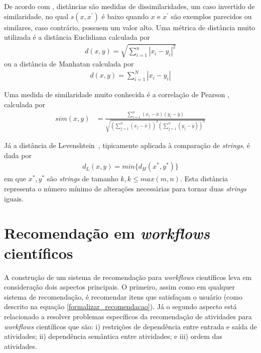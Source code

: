 De acordo com , distâncias são medidas de dissimilaridades, um caso invertido de similaridade, no qual \(s(x,x^{'})\) é baixo quando \(x\) e \(x^{'}\) são exemplos parecidos ou similares, caso contrário, possuem um valor alto. Uma métrica de distância muito utilizada é a distância Euclidiana \cite{Deza2009} calculada por
\begin{align}
d(x,y) = \sqrt{  \sum\limits_{i=1}^{n} |x_{i} - y_{i}|^{2} } \label{dist_euclidiana}
\end{align}
ou a distância de Manhatan \cite{Deza2009} calculada por
\begin{align}
d(x, y) = \sum\limits_{i=1}^{N} |x_{i} - y_{i}|\label{dist_manhattan}
\end{align}

Uma medida de similaridade muito conhecida é a correlação de Pearson \cite{Deza2009}, calculada por
\begin{align}
sim(x,y) &= \frac{\sum\limits_{i=1}^{n} (x_{i}-\bar{x})(y_{i} - \bar{y})}
{\sqrt{ \left( \sum\limits_{j=1}^{n}(x_{j}-\bar{x}) \right) ^{2} \left( \sum\limits_{j=1}^{n}(y_{j}-\bar{y})\right)^{2}} } \label{similaridade_pearson}
\end{align}

Já a distância de Levenshtein~\cite{Deza2009}, tipicamente aplicada à comparação de \emph{strings}, é dada por
\begin{align}
d_{L}(x,y) = min\{d_{H}(x^{*}, y^{*})\} \label{dist_Levenshtein}
\end{align}
em que \(x^{*}, y^{*}\) são \emph{strings} de tamanho \(k, k \leq max(m, n)\). Esta distância representa o número mínimo de alterações necessárias para tornar duas \emph{strings} iguais.

\section{Recomendação em \emph{workflows} científicos}\label{SEC_RECOMENDACAO_WORKFLOW_CIENTIFICO}
A construção de um sistema de recomendação para \emph{workflows} científicos leva em consideração dois aspectos principais. O primeiro, assim como em qualquer sistema de recomendação, é recomendar itens que satisfaçam o usuário (como descrito na equação \eqref{formalizar_recomendacao}). Já o segundo aspecto está relacionado a resolver problemas específicos da recomendação de atividades para \emph{workflows} científicos que são: i) restrições de dependência entre entrada e saída de atividades; ii) dependência semântica entre atividades; e iii) ordem das atividades.

